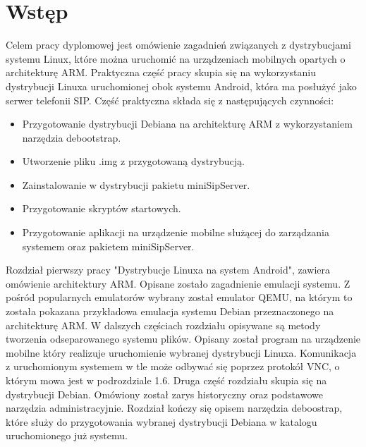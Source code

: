 

\tableofcontents

\chapter*{Wstęp}

Celem pracy dyplomowej jest omówienie zagadnień związanych z dystrybucjami systemu Linux, które można uruchomić na urządzeniach mobilnych opartych o architekturę ARM. Praktyczna część pracy skupia się na wykorzystaniu dystrybucji Linuxa uruchomionej obok systemu Android, która ma posłużyć jako serwer telefonii SIP. Część praktyczna składa się z następujących czynności:

\begin{itemize}
	\item Przygotowanie dystrybucji Debiana na architekturę ARM z wykorzystaniem narzędzia debootstrap.
	\item Utworzenie pliku .img z przygotowaną dystrybucją. 
	\item Zainstalowanie w dystrybucji pakietu miniSipServer.
	\item Przygotowanie skryptów startowych.
	\item Przygotowanie aplikacji na urządzenie mobilne służącej do zarządzania systemem oraz pakietem miniSipServer.
\end{itemize} 


Rozdział pierwszy pracy "Dystrybucje Linuxa na system Android", zawiera omówienie architektury ARM. Opisane zostało zagadnienie emulacji systemu. Z pośród popularnych emulatorów wybrany został emulator QEMU, na którym to została pokazana przykładowa emulacja systemu Debian przeznaczonego na architekturę ARM. W dalszych częściach rozdziału opisywane są metody tworzenia odseparowanego systemu plików. Opisany został program na urządzenie mobilne który realizuje uruchomienie wybranej dystrybucji Linuxa. Komunikacja z uruchomionym systemem w tle może odbywać się poprzez protokół VNC, o którym mowa jest w podrozdziale 1.6. Druga część rozdziału skupia się na dystrybucji Debian. Omówiony został zarys historyczny oraz podstawowe narzędzia administracyjnie. Rozdział kończy się opisem narzędzia deboostrap, które służy do przygotowania wybranej dystrybucji Debiana w katalogu uruchomionego już systemu. 


